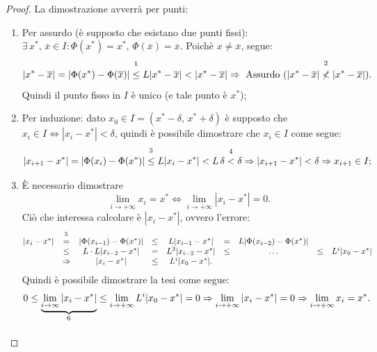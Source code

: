 \begin{proof}
	La dimostrazione avverrà per punti:
	\begin{enumerate}
		\item Per assurdo (è supposto che esistano due punti fissi): $\exists\, x^*,\, \overline{x}\in I: \Phi(x^*)=x^*,\, \Phi(\overline{x})=\overline{x}$. Poichè $x \neq \overline{x}$, segue:
		\begin{equation*}
			|x^*-\overline{x}|=|\Phi(x^*)-\Phi(\overline{x})|\overset{\footnotemark}{\leq}L|x^*-\overline{x}|<|x^*-\overline{x}| \Rightarrow\text{ Assurdo } (|x^*-\overline{x}|\overset{\footnotemark}{\nless}|x^*-\overline{x}|).
		\end{equation*}
		Quindi il punto fisso in $I$ è unico (e tale punto è $x^*$);
		\addtocounter{footnote}{-1}
		\item Per induzione: dato $x_0 \in I = (x^*-\delta,\, x^* + \delta)$ è supposto che $x_i\in I \iff |x_i-x^*|<\delta$, quindi è possibile dimostrare che $x_i\in I$ come segue:
		\begin{equation*}
			|x_{i+1}-x^*|=|\Phi(x_i)-\Phi(x^*)|\overset{\footnotemark}{\leq}L|x_i - x^*| < L\,\delta\overset{\footnotemark}{<}\delta\Rightarrow |x_{i+1}-x^*|<\delta\Rightarrow x_{i+1}\in I;
		\end{equation*}
		\item È necessario dimostrare
		\begin{equation*}
			\lim_{i\to + \infty}{x_i}=x^*\iff \lim_{i\to + \infty}{|x_i-x^*|}=0.
		\end{equation*}
		Ciò che interessa calcolare è $|x_i-x^*|$, ovvero l'errore:
		\begin{equation*}
			\begin{matrix}
				|x_i-x^*|&\overset{\footnotemark}{=}&|\Phi(x_{i-1})-\Phi(x^*)|&\leq& L|x_{i-1}-x^*|&=& L|\Phi(x_{i-2})-\Phi(x^*)|\\
				&\leq& L\cdot L |x_{i-2}-x^*|&=& L^2|x_{i-2}-x^*|&\leq& \hdots &\leq& L^i|x_0-x^*|\\
				&\Rightarrow& |x_i-x^*|&\leq& L^i|x_0-x^*|.
			\end{matrix}
		\end{equation*}
		Quindi è possibile dimostrare la tesi come segue:
		\begin{equation*}
			0\leq \underbrace{\lim_{i \to\infty}{|x_i-x^*|}}_{\footnotemark}\leq\lim_{i\to + \infty}{L^i|x_0-x^*|}=0\Rightarrow \lim_{i\to + \infty}{|x_i-x^*|}=0\Rightarrow\lim_{i\to + \infty}{x_i=x^*}.
		\end{equation*}
	\end{enumerate}
\end{proof}

